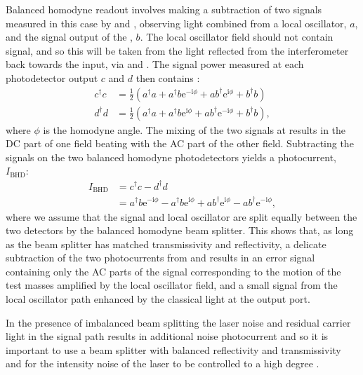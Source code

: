Balanced homodyne readout involves making a subtraction of two signals measured in this case by \HDA{} and \HDB{}, observing light combined from a local oscillator, $a$, and the signal output of the \SSM{}, $b$. The local oscillator field should not contain signal, and so this will be taken from the light reflected from the interferometer back towards the input, via \MTWELVE{} and \MTHIRTEEN{}. The signal power measured at each photodetector output $c$ and $d$ then contains \cite{Steinlechner2015}:
\begin{equation}
  \begin{split}
    c^{\dag} c &= \frac{1}{2} \left( a^{\dag} a + a^{\dag} b \text{e}^{-\text{i} \phi} + a b^{\dag} \text{e}^{\text{i} \phi} + b^{\dag} b \right) \\
    d^{\dag} d &= \frac{1}{2} \left( a^{\dag} a + a^{\dag} b \text{e}^{\text{i} \phi} + a b^{\dag} \text{e}^{-\text{i} \phi} + b^{\dag} b \right),
  \end{split}
\end{equation}
where $\phi$ is the homodyne angle. The mixing of the two signals at \MSIXTEEN{} results in the \gls{DC} part of one field beating with the \gls{AC} part of the other field. Subtracting the signals on the two balanced homodyne photodetectors yields a photocurrent, $I_{\text{BHD}}$:
\begin{equation}
  \begin{split}
    I_{\text{BHD}} &= c^{\dag} c - d^{\dag} d \\
                   &= a^{\dag} b \text{e}^{-\text{i} \phi} - a^{\dag} b \text{e}^{\text{i} \phi} + a b^{\dag} \text{e}^{\text{i} \phi} - a b^{\dag} \text{e}^{-\text{i} \phi},
  \end{split}
\end{equation}
where we assume that the signal and local oscillator are split equally between the two detectors by the balanced homodyne beam splitter. This shows that, as long as the beam splitter has matched transmissivity and reflectivity, a delicate subtraction of the two photocurrents from \HDA{} and \HDB{} results in an error signal containing only the \gls{AC} parts of the signal corresponding to the motion of the test masses amplified by the local oscillator field, and a small signal from the local oscillator path enhanced by the classical light at the output port.

In the presence of imbalanced beam splitting the laser noise and residual carrier light in the signal path results in additional noise photocurrent and so it is important to use a beam splitter with balanced reflectivity and transmissivity and for the intensity noise of the laser to be controlled to a high degree \cite{Steinlechner2015}.

